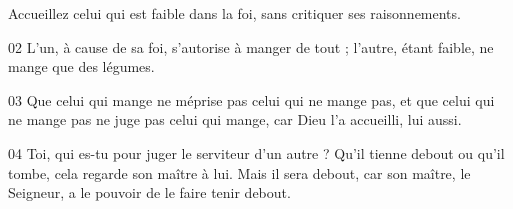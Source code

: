 Accueillez celui qui est faible dans la foi, sans critiquer ses raisonnements.

02 L’un, à cause de sa foi, s’autorise à manger de tout ; l’autre, étant faible, ne mange que des légumes.

03 Que celui qui mange ne méprise pas celui qui ne mange pas, et que celui qui ne mange pas ne juge pas celui qui mange, car Dieu l’a accueilli, lui aussi.

04 Toi, qui es-tu pour juger le serviteur d’un autre ? Qu’il tienne debout ou qu’il tombe, cela regarde son maître à lui. Mais il sera debout, car son maître, le Seigneur, a le pouvoir de le faire tenir debout.
